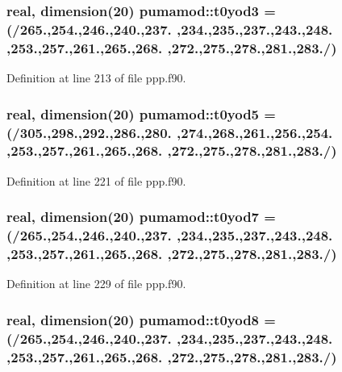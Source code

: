 \hypertarget{classpumamod_ab716103cdc0613b90aea0b0f3f76890e}{
\subsubsection[{t0yod3}]{\setlength{\rightskip}{0pt plus 5cm}real, dimension(20) {\bf pumamod\-::t0yod3} = (/265.,254.,246.,240.,237. ,234.,235.,237.,243.,248. ,253.,257.,261.,265.,268. ,272.,275.,278.,281.,283./)}}
\label{classpumamod_ab716103cdc0613b90aea0b0f3f76890e}


\-Definition at line 213 of file ppp.\-f90.

\hypertarget{classpumamod_aae0fef74d51d5c0b6ac17c46aee81602}{
\subsubsection[{t0yod5}]{\setlength{\rightskip}{0pt plus 5cm}real, dimension(20) {\bf pumamod\-::t0yod5} = (/305.,298.,292.,286.,280. ,274.,268.,261.,256.,254. ,253.,257.,261.,265.,268. ,272.,275.,278.,281.,283./)}}
\label{classpumamod_aae0fef74d51d5c0b6ac17c46aee81602}


\-Definition at line 221 of file ppp.\-f90.

\hypertarget{classpumamod_ac3109427e5fbc7662c648cc9c556bcee}{
\subsubsection[{t0yod7}]{\setlength{\rightskip}{0pt plus 5cm}real, dimension(20) {\bf pumamod\-::t0yod7} = (/265.,254.,246.,240.,237. ,234.,235.,237.,243.,248. ,253.,257.,261.,265.,268. ,272.,275.,278.,281.,283./)}}
\label{classpumamod_ac3109427e5fbc7662c648cc9c556bcee}


\-Definition at line 229 of file ppp.\-f90.

\hypertarget{classpumamod_a5a6a9e0c6cef3144d8d0c455fa24e42a}{
\subsubsection[{t0yod8}]{\setlength{\rightskip}{0pt plus 5cm}real, dimension(20) {\bf pumamod\-::t0yod8} = (/265.,254.,246.,240.,237. ,234.,235.,237.,243.,248. ,253.,257.,261.,265.,268. ,272.,275.,278.,281.,283./)}}
\label{classpumamod_a5a6a9e0c6cef3144d8d0c455fa24e42a}


